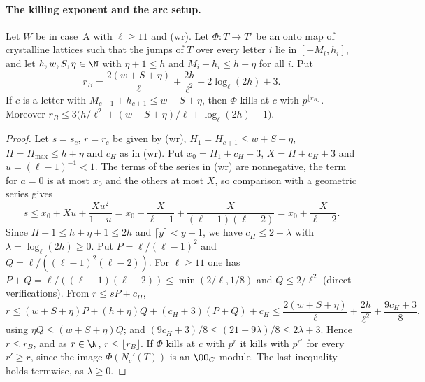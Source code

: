 \paragraph{The killing exponent and the arc setup.}

\begin{lemma}\label{pf:linkN-adm:killcut}
Let $W$ be in case~A with $\ell\ge11$ and (wr). Let $\Phi\colon T\to T'$ be an onto map of crystalline lattices such that
the jumps of $T$ over every letter $i$ lie in $[-M_i,h_i]$, and let $h,w,S,\eta\in\N$ with $\eta+1\le h$ and
$M_i+h_i\le h+\eta$ for all $i$. Put
\[
r_B=\frac{2(w+S+\eta)}\ell+\frac{2h}{\ell^2}+2\log_\ell(2h)+3 .
\]
If $c$ is a letter with $M_{c+1}+h_{c+1}\le w+S+\eta$, then $\Phi$ kills at $c$ with $p^{\lfloor r_B\rfloor}$. Moreover
$r_B\le3\bigl(h/\ell^2+(w+S+\eta)/\ell+\log_\ell(2h)+1\bigr)$.
\end{lemma}

\begin{proof}
Let $s=s_c$, $r=r_c$ be given by (wr), $H_1=H_{c+1}\le w+S+\eta$, $H=H_{\max}\le h+\eta$ and $c_H$ as in (wr). Put
$x_0=H_1+c_H+3$, $X=H+c_H+3$ and $u=(\ell-1)^{-1}<1$. The terms of the series in (wr) are nonnegative, the term for
$a=0$ is at most $x_0$ and the others at most $X$, so comparison with a geometric series gives
\[
s\le x_0+Xu+\frac{Xu^2}{1-u}=x_0+\frac X{\ell-1}+\frac X{(\ell-1)(\ell-2)}=x_0+\frac X{\ell-2}.
\]
Since $H+1\le h+\eta+1\le2h$ and $\lceil y\rceil<y+1$, we have $c_H\le2+\lambda$ with $\lambda=\log_\ell(2h)\ge0$. Put
$P=\ell/(\ell-1)^2$ and $Q=\ell/((\ell-1)^2(\ell-2))$. For $\ell\ge11$ one has $P+Q=\ell/((\ell-1)(\ell-2))\le\min(2/\ell,1/8)$
and $Q\le2/\ell^2$ (direct verifications). From $r\le sP+c_H$,
\[
r\le(w+S+\eta)P+(h+\eta)Q+(c_H+3)(P+Q)+c_H\le\frac{2(w+S+\eta)}\ell+\frac{2h}{\ell^2}+\frac{9c_H+3}8,
\]
using $\eta Q\le(w+S+\eta)Q$; and $(9c_H+3)/8\le(21+9\lambda)/8\le2\lambda+3$. Hence $r\le r_B$, and as $r\in\N$,
$r\le\lfloor r_B\rfloor$. If $\Phi$ kills at $c$ with $p^r$ it kills with $p^{r'}$ for every $r'\ge r$, since the image
$\Phi(N_c'(T))$ is an $\OO_C$-module. The last inequality holds termwise, as $\lambda\ge0$.
\end{proof}

